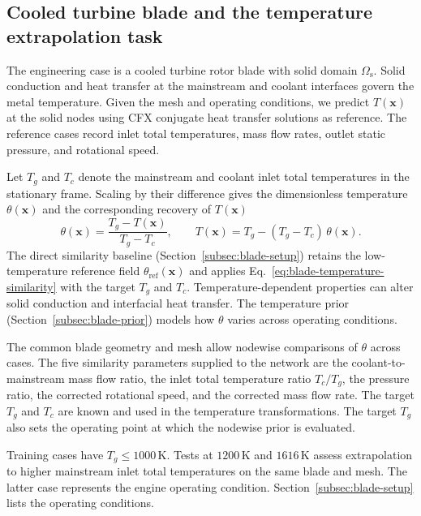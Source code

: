 \documentclass[a4paper,fleqn]{cas-sc}
\begin{document}
\subsection{Cooled turbine blade and the temperature extrapolation task}\label{subsec:blade-problem}
\par

The engineering case is a cooled turbine rotor blade with solid domain
$\Omega_{\mathrm{s}}$. Solid conduction and heat transfer at the mainstream and coolant
interfaces govern the metal temperature. Given the mesh and operating conditions,
we predict $T(\mathbf{x})$ at the solid nodes using CFX conjugate heat transfer solutions
as reference. The reference cases record inlet total temperatures, mass flow rates,
outlet static pressure, and rotational speed.

Let $T_g$ and $T_c$ denote the mainstream and coolant inlet total temperatures in the
stationary frame. Scaling by their difference gives the dimensionless temperature
$\theta(\mathbf{x})$ and the corresponding recovery of $T(\mathbf{x})$
\begin{equation}
  \label{eq:blade-temperature-similarity}
  \theta(\mathbf{x})=\frac{T_g-T(\mathbf{x})}{T_g-T_c},
  \qquad
  T(\mathbf{x})=T_g-(T_g-T_c)\,\theta(\mathbf{x}).
\end{equation}
The direct similarity baseline (Section~\ref{subsec:blade-setup}) retains the low-temperature
reference field $\theta_{\mathrm{ref}}(\mathbf{x})$ and applies
Eq.~\eqref{eq:blade-temperature-similarity} with the target $T_g$ and $T_c$.
Temperature-dependent properties can alter solid conduction and interfacial heat transfer.
The temperature prior (Section~\ref{subsec:blade-prior}) models how $\theta$ varies
across operating conditions.

The common blade geometry and mesh allow nodewise comparisons of $\theta$ across cases.
The five similarity parameters supplied to the network are the coolant-to-mainstream mass
flow ratio, the inlet total temperature ratio $T_c/T_g$, the pressure ratio, the corrected
rotational speed, and the corrected mass flow rate. The target $T_g$ and $T_c$ are known
and used in the temperature transformations. The target $T_g$ also sets the operating
point at which the nodewise prior is evaluated.

Training cases have $T_g\leq1000\,\mathrm{K}$. Tests at $1200\,\mathrm{K}$ and
$1616\,\mathrm{K}$ assess extrapolation to higher mainstream inlet total temperatures on the
same blade and mesh. The latter case represents the engine operating condition.
Section~\ref{subsec:blade-setup} lists the operating conditions.
\end{document}
